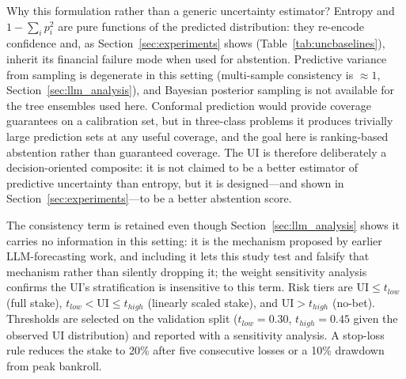 \begin{table}[htbp]
\centering
\small
\caption{Components of the uncertainty index and the quantity each is
intended to measure. The first two terms quantify forecast
uncertainty, the last two decision uncertainty.}
\label{tab:uicomponents}
\end{table}

Why this formulation rather than a generic uncertainty estimator?
Entropy and $1 - \sum_i p_i^2$ are pure functions of the predicted
distribution: they re-encode confidence and, as
Section~\ref{sec:experiments} shows
(Table~\ref{tab:uncbaselines}), inherit its financial failure mode
when used for abstention. Predictive variance from sampling is
degenerate in this setting (multi-sample consistency is $\approx 1$,
Section~\ref{sec:llm_analysis}), and Bayesian posterior sampling is
not available for the tree ensembles used here. Conformal prediction
would provide coverage guarantees on a calibration set, but in
three-class problems it produces trivially large prediction sets at
any useful coverage, and the goal here is ranking-based abstention
rather than guaranteed coverage. The UI is therefore deliberately a
decision-oriented composite: it is not claimed to be a better
estimator of predictive uncertainty than entropy, but it is
designed---and shown in Section~\ref{sec:experiments}---to be a
better abstention score.

The consistency term is retained even though Section~\ref{sec:llm_analysis} shows it carries
no information in this setting: it is the mechanism proposed by
earlier LLM-forecasting work, and including it lets this study test
and falsify that mechanism rather than silently dropping it; the
weight sensitivity analysis confirms the UI's stratification is
insensitive to this term. Risk tiers are
$\mathrm{UI} \le t_{low}$ (full stake), $t_{low} < \mathrm{UI} \le
t_{high}$ (linearly scaled stake), and $\mathrm{UI} > t_{high}$
(no-bet). Thresholds are selected on the validation split
($t_{low}=0.30$, $t_{high}=0.45$ given the observed UI distribution)
and reported with a sensitivity analysis. A stop-loss rule reduces
the stake to 20\% after five consecutive losses or a 10\% drawdown
from peak bankroll.

